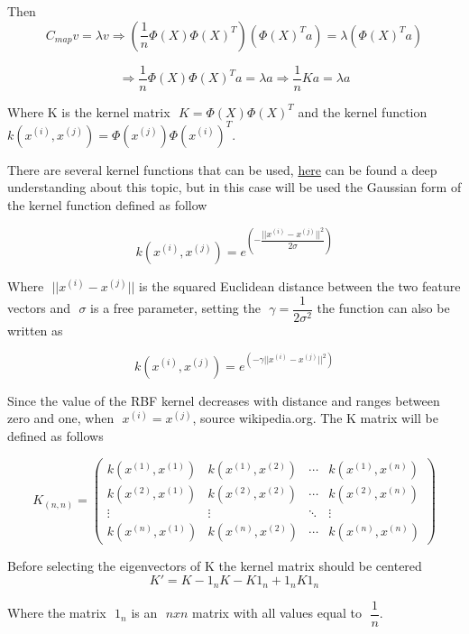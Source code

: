 \documentclass[11pt]{article}
\begin{document}
Then
\begin{equation*}
C_{map}v = \lambda v \Rightarrow (\dfrac{1}{n}\Phi(X)\Phi(X)^T)(\Phi(X)^Ta) = \lambda(\Phi(X)^Ta) 
\end{equation*}

\begin{equation*}
\Rightarrow \dfrac{1}{n}\Phi(X)\Phi(X)^Ta = \lambda a \Rightarrow \dfrac{1}{n}Ka = \lambda a
\end{equation*}

Where K is the kernel matrix \( \) $ K = \Phi(X)\Phi(X)^T $ and the kernel function \( \) $ k(x^{(i)}, x^{(j)}) = \Phi(x^{(j)})\Phi(x^{(i)})^T $.



There are several kernel functions that can be used, \href{https://www.sciencedirect.com/topics/computer-science/kernel-function}{here} can be found a deep understanding about this topic, but in this case will be used the Gaussian form of the kernel function defined as follow

\begin{equation*}
k(x^{(i)}, x^{(j)}) = e^{(-\dfrac{||x^{(i)} - x^{(j)}||^2}{2\sigma})}
\end{equation*}

Where \( \) $ ||x^{(i)} - x^{(j)}|| $ is the squared Euclidean distance between the two feature vectors and \( \) $ \sigma $ is a free parameter, setting the \( \) $ \gamma = \dfrac{1}{2\sigma^2} $ the function can also be written as

\begin{equation*}
k(x^{(i)}, x^{(j)}) = e^{(-\gamma{||x^{(i)} - x^{(j)}||^2})}
\end{equation*}

Since the value of the RBF kernel decreases with distance and ranges between zero and one, when \( \) $ x^{(i)} = x^{(j)}$, source wikipedia.org. The K matrix will be defined as follows

\begin{equation*}
K_{(n,n)} = 
\begin{pmatrix}
k({x^{(1)}, x^{(1)}}) & k({x^{(1)}, x^{(2)}}) & \cdots & k({x^{(1)}, x^{(n)}}) \\
k({x^{(2)}, x^{(1)}}) & k({x^{(2)}, x^{(2)}}) & \cdots & k({x^{(2)}, x^{(n)}}) \\
\vdots  & \vdots  & \ddots & \vdots  \\
k({x^{(n)}, x^{(1)}}) & k({x^{(n)}, x^{(2)}}) & \cdots & k({x^{(n)}, x^{(n)}})
\end{pmatrix}
\end{equation*}

Before selecting the eigenvectors of K the kernel matrix should be centered
\begin{equation*}
K' = K - 1_n K - K1_n + 1_nK1_n
\end{equation*}

Where the matrix \( \) $ 1_n $ is an \( \) $ n x n $ matrix with all values equal to \( \) $ \dfrac{1}{n} $.
\end{document}
